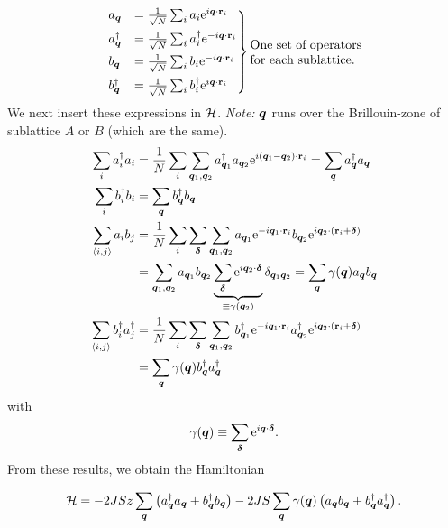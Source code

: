 \begin{equation}
	\begin{rcases}
		a_{\vq} &= \frac{1}{\sqrt{N}}\sum_{i}a_{i} \e^{i\vq\cdot\vb{r}_i} \\
		a_{\vq}^{\dg} &= \frac{1}{\sqrt{N}}\sum_{i}a_i^{\dg} \e^{-i\vq\cdot\vb{r}_i} \\
		b_{\vq} &= \frac{1}{\sqrt{N}}\sum_{i}b_{i} \e^{-i\vq\cdot\vb{r}_i} \\
		b_{\vq}^{\dg} &= \frac{1}{\sqrt{N}}\sum_{i}b_i^{\dg} \e^{i\vq\cdot\vb{r}_i}
	\end{rcases}\parbox[h]{3.1cm}{One set of operators for each sublattice.}
\end{equation}
We next insert these expressions in $\mathcal{H}$. 
\emph{Note:} $\bm{q}$ runs over the Brillouin-zone of sublattice $A$ or $B$ (which are the same).
\begin{align}
	\sum_{i}a_{i}^{\dagger} a_{i} &= \frac{1}{N}\sum_{i}\sum_{\bm{q}_1, \bm{q}_2}a_{\bm{q}_1}^{\dagger}a_{\bm{q}_2}\mathrm{e}^{i(\bm{q}_1-\bm{q}_2)\cdot\vb{r}_i} = \sum_{\bm{q}}a_{\bm{q}}^{\dagger}a_{\bm{q}} \\\
	\sum_{i}b_{i}^{\dagger} b_{i} &=\sum_{\bm{q}}b_{\bm{q}}^{\dagger}b_{\bm{q}} \\
	\sum_{\langle i,j \rangle}a_{i}b_{j} &= \frac{1}{N}\sum_{i}\sum_{\bm{\delta}}\sum_{\bm{q}_1, \bm{q}_2}a_{\bm{q}_1}\mathrm{e}^{-i\bm{q}_1\cdot \vb{r}_i}b_{\bm{q}_2}\mathrm{e}^{i\bm{q}_2\cdot (\vb{r}_i + \bm{\delta})} \nonumber \\
	&=\sum_{\bm{q}_1, \bm{q}_2} a_{\bm{q}_1}b_{\bm{q}_2} \underbrace{\sum_{\bm{\delta}}\mathrm{e}^{i\bm{q}_2\cdot\bm{\delta}}}_{\equiv \gamma(\bm{q}_2)}\delta_{\bm{q}_1\bm{q}_2} =\sum_{\bm{q}}\gamma(\bm{q})a_{\bm{q}}b_{\bm{q}} \\
	\sum_{\langle i,j \rangle}b_{i}^{\dagger}a_{j}^{\dagger} &= \frac{1}{N}\sum_{i}\sum_{\bm{\delta}}\sum_{\bm{q}_1, \bm{q}_2}b_{\bm{q}_1}^{\dagger}\mathrm{e}^{-i\bm{q}_1\cdot \vb{r}_i} a_{\bm{q}_2}^{\dagger}\mathrm{e}^{i\bm{q}_2\cdot (\vb{r}_i + \bm{\delta})} \nonumber \\
	&= \sum_{\bm{q}}\gamma(\bm{q})b_{\bm{q}}^{\dagger}a_{\bm{q}}^{\dagger}
\end{align}
with
\begin{equation}\label{eq:gamma_q}
	\gamma(\bm{q}) \equiv \sum_{\bm{\delta}}\mathrm{e}^{i\bm{q} \cdot\bm{\delta}}.
\end{equation}
From these results, we obtain the Hamiltonian
\begin{tcolorbox}
	\begin{equation}\label{eq:hamiltonian_AFM_momentumspace}
		\mathcal{H} =  -2JSz\sum_{\bm{q}}\left (a_{\bm{q}}^{\dagger}a_{\bm{q}} + b_{\bm{q}}^{\dagger}b_{\bm{q}}\right ) -2JS\sum_{\bm{q}}\gamma(\bm{q})\left (a_{\bm{q}}b_{\bm{q}} +  b_{\bm{q}}^{\dagger}a_{\bm{q}}^{\dagger}\right ) .
	\end{equation}
\end{tcolorbox}
